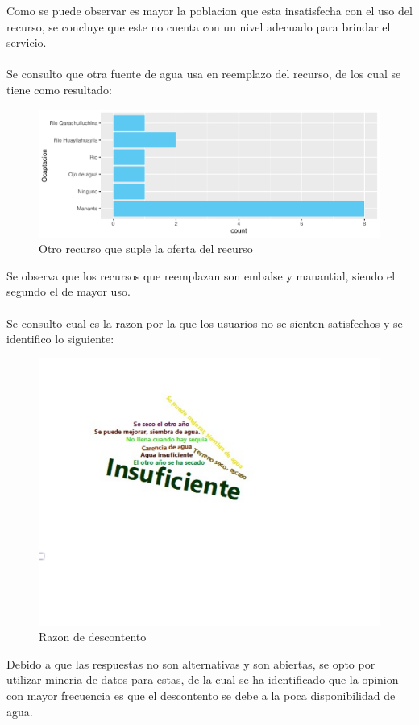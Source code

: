 \documentclass[12pt]{article}\usepackage[]{graphicx}\usepackage[]{xcolor}
\makeatletter
\def\maxwidth{ %
  \ifdim\Gin@nat@width>\linewidth
    \linewidth
  \else
    \Gin@nat@width
  \fi
}
\newenvironment{knitrout}{}{} %
\makeatother
\begin{document}
	Como se puede observar es mayor la poblacion que esta insatisfecha con el uso del recurso, se concluye que este no cuenta con un nivel adecuado para brindar el servicio.\\
	\\
	Se consulto que otra fuente de agua usa en reemplazo del recurso, de los cual se tiene como resultado:
	\begin{figure}[H]
	\centering
\begin{knitrout}
\color{fgcolor}
\includegraphics[width=\maxwidth]{figure/diecisiete-1} 
\end{knitrout}
	\caption{Otro recurso que suple la oferta del recurso}
	\end{figure}
	Se observa que los recursos que reemplazan son embalse y manantial, siendo el segundo el de mayor uso.\\
	\\
	Se consulto cual es la razon por la que los usuarios no se sienten satisfechos y se identifico lo siguiente:
	\begin{figure}[H]
	\centering
\begin{knitrout}
\color{fgcolor}
\includegraphics[width=\maxwidth]{figure/dieciocho-1} 
\end{knitrout}
	\caption{Razon de descontento}
	\end{figure}
	Debido a que las respuestas no son alternativas y son abiertas, se opto por utilizar mineria de datos para estas, de la cual se ha identificado que la opinion con mayor frecuencia es que el descontento se debe a la poca disponibilidad de agua.
\end{document}
